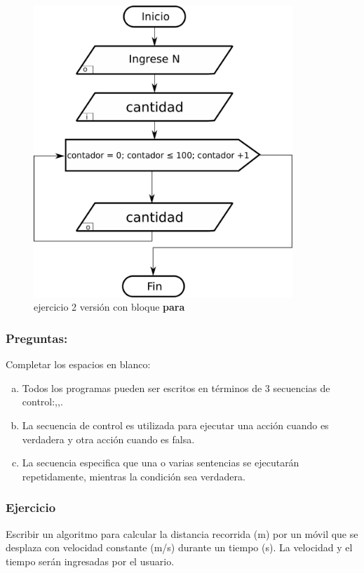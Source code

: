 \begin{figure}[h!]
  \centering
  \includegraphics[height=110mm]{./img/ejercicio_3.pdf} 
  \caption{ejercicio 2 versión con bloque \textbf{para}}
\end{figure}

\pagebreak
\subsubsection{Preguntas:}
Completar los espacios en blanco:\\
\begin{enumerate}[a)]
  \item Todos los programas pueden ser escritos en términos de 3 secuencias de control:\underspace,\underspace,\underspace.
  \item La secuencia de control \underspace es utilizada para ejecutar una acción cuando es verdadera y otra acción cuando es falsa.
  \item La secuencia \underspace especifica que una o varias sentencias se ejecutarán repetidamente, mientras la condición sea verdadera.
\end{enumerate}


\pagebreak
\subsubsection{Ejercicio}
Escribir un algoritmo para calcular la distancia recorrida (m) por un móvil que se desplaza con velocidad constante (m/s) durante un tiempo (s). 
La velocidad y el tiempo serán ingresadas por el usuario.

